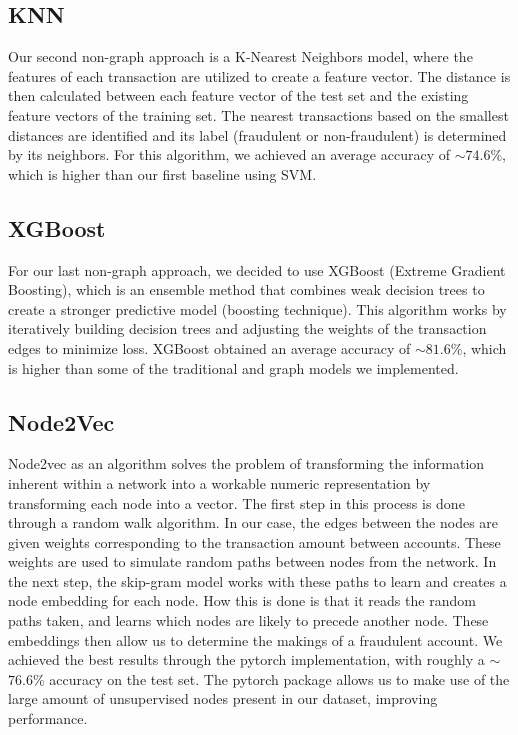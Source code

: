 \documentclass{article}
\begin{document}
\subsection{KNN}
        Our second non-graph approach is a K-Nearest Neighbors model, where the features of each transaction are utilized to create a feature vector. The distance is then calculated between each feature vector of the test set and the existing feature vectors of the training set. The nearest transactions based on the smallest distances are identified and its label (fraudulent or non-fraudulent) is determined by its neighbors. For this algorithm, we achieved an average accuracy of $\sim$$74.6\%$, which is higher than our first baseline using SVM. 

\subsection{XGBoost}
        For our last non-graph approach, we decided to use XGBoost (Extreme Gradient Boosting), which is an ensemble method that combines weak decision trees to create a stronger predictive model (boosting technique). This algorithm works by iteratively building decision trees and adjusting the weights of the transaction edges to minimize loss. XGBoost obtained an average accuracy of $\sim$$81.6\%$, which is higher than some of the traditional and graph models we implemented. 


\subsection{Node2Vec}
	Node2vec as an algorithm solves the problem of transforming the information inherent within a network into a workable numeric representation by transforming each node into a vector. The first step in this process is done through a random walk algorithm. In our case, the edges between the nodes are given weights corresponding to the transaction amount between accounts. These weights are used to simulate random paths between nodes from the network. In the next step, the skip-gram model works with these paths to learn and creates a node embedding for each node. How this is done is that it reads the random paths taken, and learns which nodes are likely to precede another node. These embeddings then allow us to determine the makings of a fraudulent account. We achieved the best results through the pytorch implementation, with roughly a $\sim$$76.6\%$  accuracy on the test set. The pytorch package allows us to make use of the large amount of unsupervised nodes present in our dataset, improving performance.
\end{document}
